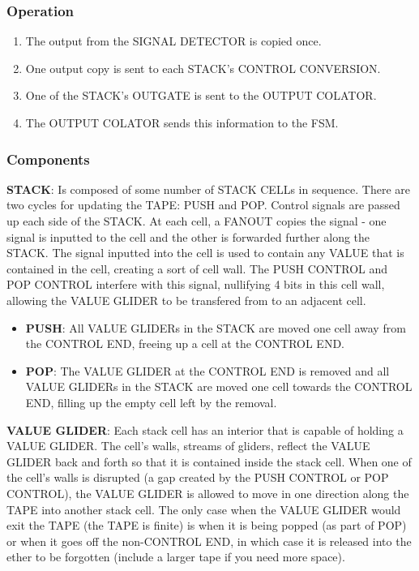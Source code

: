 \documentclass{article}
\begin{document}
\subsubsection{Operation}\begin{enumerate}
\item The output from the SIGNAL DETECTOR is copied once.


\item One output copy is sent to each STACK's CONTROL CONVERSION.


\item One of the STACK's OUTGATE is sent to the OUTPUT COLATOR.


\item The OUTPUT COLATOR sends this information to the FSM.

\end{enumerate}\subsubsection{Components}
\noindent\textbf{STACK}: Is composed of some number of STACK CELLs in sequence. There are two cycles for updating the TAPE: PUSH and POP. Control signals are passed up each side of the STACK. At each cell, a FANOUT copies the signal - one signal is inputted to the cell and the other is forwarded further along the STACK. The signal inputted into the cell is used to contain any VALUE that is contained in the cell, creating a sort of cell wall. The PUSH CONTROL and POP CONTROL interfere with this signal, nullifying 4 bits in this cell wall, allowing the VALUE GLIDER to be transfered from to an adjacent cell.
\begin{itemize}
\item  \textbf{PUSH}: All VALUE GLIDERs in the STACK are moved one cell away from the CONTROL END, freeing up a cell at the CONTROL END.
 

\item  \textbf{POP}: The VALUE GLIDER at the CONTROL END is removed and all VALUE GLIDERs in the STACK are moved one cell towards the CONTROL END, filling up the empty cell left by the removal.
 
\end{itemize}
\vspace{1em}

\noindent\textbf{VALUE GLIDER}: Each stack cell has an interior that is capable of holding a VALUE GLIDER. The cell's walls, streams of gliders, reflect the VALUE GLIDER back and forth so that it is contained inside the stack cell. When one of the cell's walls is disrupted (a gap created by the PUSH CONTROL or POP CONTROL), the VALUE GLIDER is allowed to move in one direction along the TAPE into another stack cell. The only case when the VALUE GLIDER would exit the TAPE (the TAPE is finite) is when it is being popped (as part of POP) or when it goes off the non-CONTROL END, in which case it is released into the ether to be forgotten (include a larger tape if you need more space).
\end{document}
